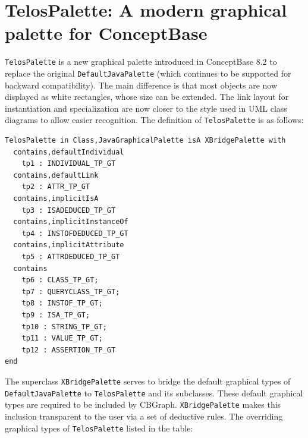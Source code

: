 \section{TelosPalette: A modern graphical palette for ConceptBase}
\label{telospalette}

{\tt TelosPalette} is a new graphical palette introduced in ConceptBase 8.2 to replace the original
{\tt Default\-Java\-Palette} (which continues to be supported for backward compatibility). The main difference
is that most objects are now displayed as white rectangles, whose size can be extended. The link layout for
instantiation and specialization are now closer to the style used in UML class diagrams to allow easier
recognition. The definition of {\tt TelosPalette} is as follows:

{\small
\begin{verbatim}
TelosPalette in Class,JavaGraphicalPalette isA XBridgePalette with 
  contains,defaultIndividual
    tp1 : INDIVIDUAL_TP_GT
  contains,defaultLink
    tp2 : ATTR_TP_GT
  contains,implicitIsA
    tp3 : ISADEDUCED_TP_GT
  contains,implicitInstanceOf
    tp4 : INSTOFDEDUCED_TP_GT
  contains,implicitAttribute
    tp5 : ATTRDEDUCED_TP_GT
  contains
    tp6 : CLASS_TP_GT;
    tp7 : QUERYCLASS_TP_GT;
    tp8 : INSTOF_TP_GT;
    tp9 : ISA_TP_GT;
    tp10 : STRING_TP_GT;
    tp11 : VALUE_TP_GT;
    tp12 : ASSERTION_TP_GT
end 
\end{verbatim}
}

The superclass {\tt XBridgePalette} serves to bridge the default graphical types of {\tt Default\-Java\-Palette}
to {\tt TelosPalette} and its subclasses. These default graphical types are required to be included by
CBGraph. {\tt XBridgePalette} makes this inclusion transparent to the user via a set of deductive rules.
The overriding graphical types of {\tt TelosPalette} listed in the table:

